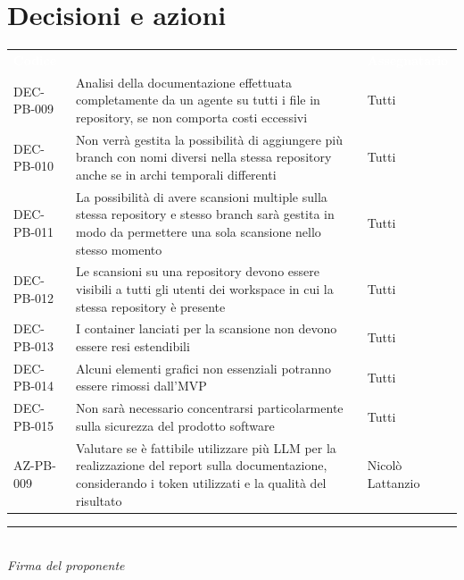 \documentclass[a4paper, 11pt]{article}
\begin{document}
\section{Decisioni e azioni}
\begin{center}
    \begin{tabular}{>{\centering\arraybackslash}m{3cm} >{\raggedright\arraybackslash}p{8cm} >{\centering\arraybackslash}p{2.5cm}}
        \rowcolor{AccentColor}
        \textcolor{white}{\textbf{Codice}} & 
        \multicolumn{1}{c}{\textcolor{white}{\textbf{Descrizione}}} & 
        \textcolor{white}{\textbf{Assegnatario}} \\
        
        DEC-PB-009 & Analisi della documentazione effettuata completamente da un agente su tutti i file in repository, se non comporta costi eccessivi  & Tutti \\

        DEC-PB-010 & Non verrà gestita la possibilità di aggiungere più branch con nomi diversi nella stessa repository anche se in archi temporali differenti & Tutti \\

        DEC-PB-011 & La possibilità di avere scansioni multiple sulla stessa repository e stesso branch sarà gestita in modo da permettere una sola scansione nello stesso momento & Tutti \\

        DEC-PB-012 & Le scansioni su una repository devono essere visibili a tutti gli utenti dei workspace in cui la stessa repository è presente & Tutti \\

        DEC-PB-013 & I container lanciati per la scansione non devono essere resi estendibili& Tutti \\

        DEC-PB-014 & Alcuni elementi grafici non essenziali potranno essere rimossi dall'MVP & Tutti \\

        DEC-PB-015 & Non sarà necessario concentrarsi particolarmente sulla sicurezza del prodotto software & Tutti \\
        
        \midrule

        AZ-PB-009 & Valutare se è fattibile utilizzare più LLM per la realizzazione del report sulla documentazione, considerando i token utilizzati e la qualità del risultato & Nicolò Lattanzio \\


    \end{tabular}

    \vspace{1.5cm}
    \rule{6cm}{0.4pt}\\
    \textit{Firma del proponente}

\end{center}
\end{document}
